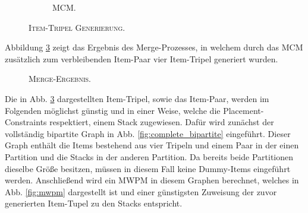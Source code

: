 \begin{figure}[H]
\begin{subfigure}[b]{0.4\textwidth}
\caption{\textsc{MCM}.}
\label{fig:item_triple_mcm}
\end{subfigure}

\caption{\textsc{Item-Tripel Generierung.}}
\label{fig:item_triple_generation}
\end{figure}

Abbildung \ref{fig:merge_result} zeigt das Ergebnis des Merge-Prozesses, in welchem durch das
\textsc{MCM} zusätzlich zum verbleibenden Item-Paar vier Item-Tripel generiert wurden.
\begin{figure}[H]
\centering
{}
\caption{\textsc{Merge-Ergebnis.}}
\label{fig:merge_result}
\end{figure}

Die in Abb. \ref{fig:merge_result} dargestellten Item-Tripel, sowie das Item-Paar, werden im Folgenden
möglichst günstig und in einer Weise, welche die Placement-Constraints respektiert, einem Stack zugewiesen.
Dafür wird zunächst der vollständig bipartite Graph in Abb. \ref{fig:complete_bipartite} eingeführt.
Dieser Graph enthält die Items bestehend aus vier Tripeln und einem Paar in der einen Partition
und die Stacks in der anderen Partition. Da bereits beide Partitionen dieselbe Größe
besitzen, müssen in diesem Fall keine Dummy-Items eingeführt werden. Anschließend wird ein \textsc{MWPM} in diesem Graphen berechnet, welches
in Abb. \ref{fig:mwpm} dargestellt ist und einer günstigsten Zuweisung der zuvor generierten Item-Tupel zu den Stacks entspricht.

